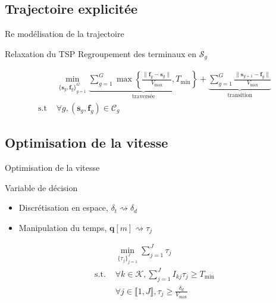 \subsection{Trajectoire explicitée}
\begin{frame}{Re modélisation de la trajectoire}
  \begin{block}{Relaxation du TSP}
    Regroupement des terminaux en \( \mathcal{S}_g \)
  \end{block}
  \begin{align}
    & \min_{
        {\{\mathbf{s}_g, \mathbf{f}_g\}}_{g=1}^G
      }
      \underbrace{
      \sum_{g = 1}^G \max \left\{
      \frac{
      \| \mathbf{f}_g - \mathbf{s}_g \|
      }{
      V_{\text{max}}
      }, T_{\text{min}}
      \right\}
      }_{\text{traversée}} +
      \underbrace{
      \sum_{g = 1}^G
      \frac{
      \| \mathbf{s}_{g + 1} - \mathbf{f}_g \|
      }{
      V_{\text{max}}
      }
      }_{\text{transition}} \tag{P4} \\
    \text{s.t } & \forall g, (\mathbf{s}_g, \mathbf{f}_g) \in \mathcal{C}_g
  \end{align}
\end{frame}

\subsection{Optimisation de la vitesse}
\begin{frame}{Optimisation de la vitesse}
  \begin{block}{Variable de décision}
    \begin{itemize}
    \item Discrétisation en espace, \( \delta_t \rightsquigarrow
      \delta_d \)
    \item Manipulation du temps, \( \mathbf{q}[m] \rightsquigarrow
      \tau_j \)
    \end{itemize}
  \end{block}
  \begin{align}
    & \min_{\{\tau_j\}_{j = 1}^J} \sum_{j = 1}^J \tau_j \tag{P5} \\
    \text{s.t. } & \forall k \in \mathcal{K}, \sum_{j = 1}^J I_{kj}
                   \tau_j \geq T_{\text{min}} \\
    & \forall j \in \llbracket 1, J \rrbracket,
      \tau_j \geq \frac{\delta_d}{V_{\text{max}}}
  \end{align}
\end{frame}

